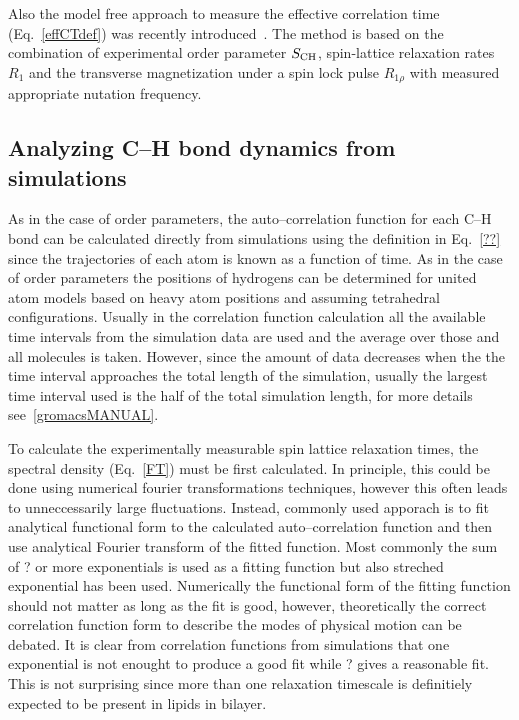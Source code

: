 \documentclass[aps,prl,superscriptaddress,twocolumn]{revtex4}
\begin{document}
Also the model free approach to measure the effective correlation time (Eq.~\ref{effCTdef}) was recently
introduced~\cite{ferreira15}. The method is based on the combination of experimental order parameter $S_{{\rm CH}}$,
spin-lattice relaxation rates $R_1$ and the transverse magnetization under a spin lock pulse $R_{1\rho}$ with measured 
appropriate nutation frequency.



\subsection{Analyzing C--H bond dynamics from simulations}

As in the case of order parameters, the auto--correlation function for each C--H bond can be
calculated directly from simulations using the definition in Eq.~\ref{??} since the trajectories of each atom is known
as a function of time. As in the case of order parameters the positions of hydrogens can be determined 
for united atom models based on heavy atom positions and assuming tetrahedral configurations.
Usually in the correlation function calculation all the available time intervals from the 
simulation data are used and the average over those and all molecules is taken. However, since the 
amount of data decreases when the the time interval approaches the total length of the simulation,
usually the largest time interval used is the half of the total simulation length, for more details
see~\ref{gromacsMANUAL}.

To calculate the experimentally measurable spin lattice relaxation times, the spectral density (Eq.~\ref{FT})
must be first calculated. In principle, this could be done using numerical fourier transformations techniques, 
however this often leads to unneccessarily large fluctuations. Instead, commonly used apporach is to fit 
analytical functional form to the calculated auto--correlation function and then use analytical Fourier
transform of the fitted function. Most commonly the sum of ? or more exponentials is used as a fitting function but
also streched exponential has been used. Numerically the functional form of the fitting function should not matter as
long as the fit is good, however, theoretically the correct correlation function form to describe the modes of
physical motion can be debated. It is clear from correlation functions from simulations that one exponential 
is not enought to produce a good fit while ? gives a reasonable fit. This is not surprising since more
than one relaxation timescale is definitiely expected to be present in lipids in bilayer.
\end{document}
